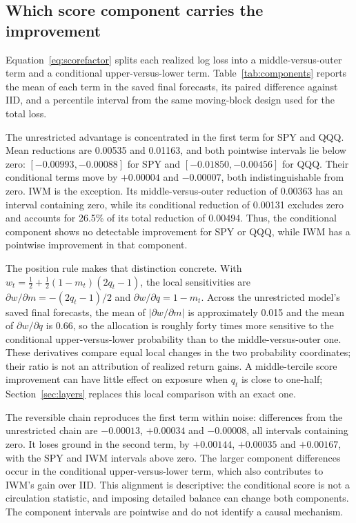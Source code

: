 \subsection{Which score component carries the improvement}\label{sec:components}
Equation~\eqref{eq:scorefactor} splits each realized log loss into a middle-versus-outer term and a conditional upper-versus-lower term. Table~\ref{tab:components} reports the mean of each term in the saved final forecasts, its paired difference against IID, and a percentile interval from the same moving-block design used for the total loss.

The unrestricted advantage is concentrated in the first term for SPY and QQQ. Mean reductions are 0.00535 and 0.01163, and both pointwise intervals lie below zero: $[-0.00993,-0.00088]$ for SPY and $[-0.01850,-0.00456]$ for QQQ. Their conditional terms move by $+0.00004$ and $-0.00007$, both indistinguishable from zero. IWM is the exception. Its middle-versus-outer reduction of 0.00363 has an interval containing zero, while its conditional reduction of 0.00131 excludes zero and accounts for 26.5\% of its total reduction of 0.00494. Thus, the conditional component shows no detectable improvement for SPY or QQQ, while IWM has a pointwise improvement in that component.

The position rule makes that distinction concrete. With $w_t=\tfrac12+\tfrac12(1-m_t)(2q_t-1)$, the local sensitivities are $\partial w/\partial m=-(2q_t-1)/2$ and $\partial w/\partial q=1-m_t$. Across the unrestricted model's saved final forecasts, the mean of $|\partial w/\partial m|$ is approximately 0.015 and the mean of $\partial w/\partial q$ is 0.66, so the allocation is roughly forty times more sensitive to the conditional upper-versus-lower probability than to the middle-versus-outer one. These derivatives compare equal local changes in the two probability coordinates; their ratio is not an attribution of realized return gains. A middle-tercile score improvement can have little effect on exposure when $q_t$ is close to one-half; Section~\ref{sec:layers} replaces this local comparison with an exact one.

The reversible chain reproduces the first term within noise: differences from the unrestricted chain are $-0.00013$, $+0.00034$ and $-0.00008$, all intervals containing zero. It loses ground in the second term, by $+0.00144$, $+0.00035$ and $+0.00167$, with the SPY and IWM intervals above zero. The larger component differences occur in the conditional upper-versus-lower term, which also contributes to IWM's gain over IID. This alignment is descriptive: the conditional score is not a circulation statistic, and imposing detailed balance can change both components. The component intervals are pointwise and do not identify a causal mechanism.

